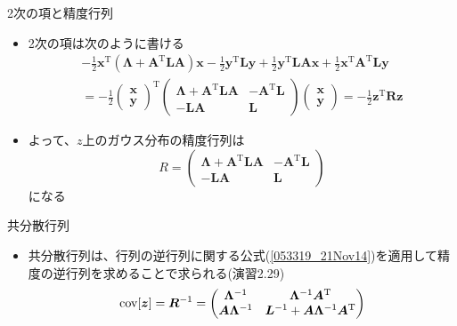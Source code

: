 \begin{frame}{2次の項と精度行列}
 \begin{itemize}
  \item 2次の項は次のように書ける
        \begin{eqnarray}
         -\frac{1}{2}\bm{x}^{\mathrm{T}}(\bm{\Lambda}+\bm{A}^{\mathrm{T}}\bm{L}\bm{A})\bm{x} -\frac{1}{2}\bm{y}^{\mathrm{T}}\bm{L}\bm{y}+\frac{1}{2}\bm{y}^{\mathrm{T}}\bm{L}\bm{A}\bm{x}+\frac{1}{2}\bm{x}^{\mathrm{T}}\bm{A}^{\mathrm{T}}\bm{L}\bm{y} \nonumber \\
         = -\frac{1}{2}
          \begin{pmatrix}
           \bm{x} \\
           \bm{y}
          \end{pmatrix}^{\mathrm{T}}
          \begin{pmatrix}
           \bm{\Lambda}+\bm{A}^{\mathrm{T}}\bm{L}\bm{A} & -\bm{A}^{\mathrm{T}}\bm{L}\\
           -\bm{L}\bm{A} & \bm{L}
          \end{pmatrix}
          \begin{pmatrix}
           \bm{x} \\
           \bm{y}
          \end{pmatrix}
          = -\frac{1}{2}\bm{z}^{\mathrm{T}}\bm{R}\bm{z}
        \end{eqnarray}
  \item よって、$z$上のガウス分布の精度行列は
        \begin{equation}
         R=
          \begin{pmatrix}
           \bm{\Lambda}+\bm{A}^{\mathrm{T}}\bm{L}\bm{A} & -\bm{A}^{\mathrm{T}}\bm{L}\\
           -\bm{L}\bm{A} & \bm{L}
          \end{pmatrix}
        \end{equation}
        になる
 \end{itemize}
\end{frame}

\begin{frame}{共分散行列}
 \begin{itemize}
  \item 共分散行列は、行列の逆行列に関する公式(\ref{053319_21Nov14})を適用して精度の逆行列を求めることで求られる(演習2.29)
        \begin{equation}
         {\rm cov}[\bm{z}]=\bm{R}^{-1}=
          \begin{pmatrix}
           \bm{\Lambda}^{-1} & \bm{\Lambda}^{-1}\bm{A}^{\mathrm{T}} \\
           \bm{A}\bm{\Lambda}^{-1} & \bm{L}^{-1} + \bm{A}\bm{\Lambda}^{-1}\bm{A}^{\mathrm{T}}
          \end{pmatrix}\label{054122_21Nov14}
        \end{equation}
 \end{itemize}
\end{frame}

